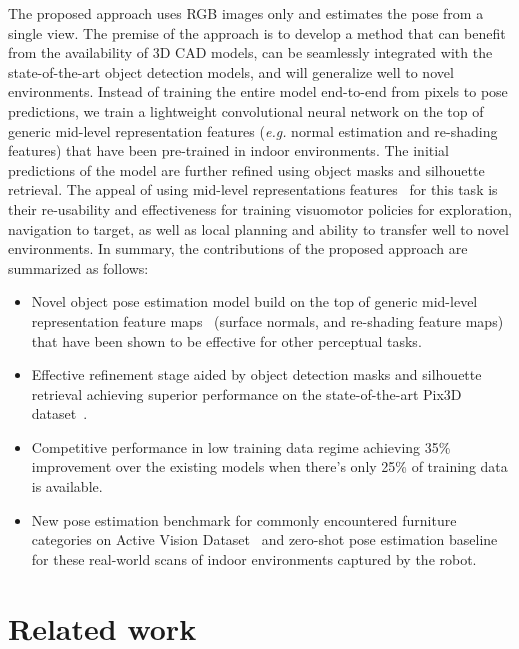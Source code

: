 \documentclass[letterpaper, 10 pt, conference]{ieeeconf}  \pdfoutput=1
\begin{document}
The proposed approach uses RGB images only and estimates the pose from a single view. The premise of the approach is to develop a method that can benefit from the availability of 3D CAD models, can be seamlessly integrated with the state-of-the-art object detection models, and will generalize well to novel environments. Instead of training the entire model end-to-end from pixels to pose predictions, we train a lightweight convolutional neural network on the top of generic mid-level representation features ({\em e.g.} normal estimation and re-shading features) that have been pre-trained in indoor environments. The initial predictions of the model are further refined using object masks and silhouette retrieval. The appeal of using mid-level representations features~\cite{midLevelReps2018} for this task is their re-usability and effectiveness for training visuomotor policies for exploration, navigation to target, as well as local planning and ability to transfer well to novel environments. 
In summary, the contributions of the proposed approach are summarized as follows:
\begin{itemize}
    \item Novel object pose estimation model build on the top of generic mid-level representation feature maps~\cite{taskonomy2018} (surface normals, and re-shading feature maps) that have been shown to be effective for other perceptual tasks. 
    \item Effective refinement stage aided by object detection masks and silhouette retrieval  achieving superior performance on the state-of-the-art Pix3D dataset~\cite{pix3d}.
    \item Competitive performance in low training data regime achieving 35\% improvement over the existing models when there's only 25\% of training data is available.
    \item New pose estimation benchmark for commonly encountered furniture categories on Active Vision Dataset~\cite{Ammirato2017ADF} and zero-shot pose estimation baseline for these real-world scans of indoor environments captured by the robot.
\end{itemize}





\section{ Related work}
\end{document}
